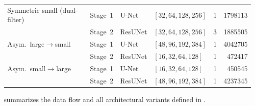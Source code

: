 \begin{table}[!ht]
\begin{tabular}{@{}llllrr@{}}
        Symmetric small (dual-filter)
                       & Stage~1 & U-Net   & $[32,64,128,256]$  & 1 & \num{1798113} \\
                       & Stage~2 & ResUNet & $[32,64,128,256]$  & 3 & \num{1885505} \\
        Asym.\ large$\to$small
                       & Stage~1 & U-Net   & $[48,96,192,384]$  & 1 & \num{4042705} \\
                       & Stage~2 & ResUNet & $[16,32,64,128]$   & 1 & \num{472417}  \\
        Asym.\ small$\to$large
                       & Stage~1 & U-Net   & $[16,32,64,128]$   & 1 & \num{450545}  \\
                       & Stage~2 & ResUNet & $[48,96,192,384]$  & 1 & \num{4237345} \\
        \bottomrule
    \end{tabular}
\end{table}

 summarizes the data flow and all architectural variants
defined in .

